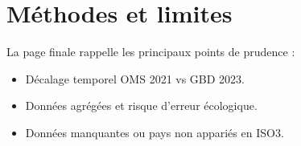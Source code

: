 \section{Méthodes et limites}
La page finale rappelle les principaux points de prudence :
\begin{itemize}
    \item Décalage temporel OMS 2021 vs GBD 2023.
    \item Données agrégées et risque d'erreur écologique.
    \item Données manquantes ou pays non appariés en ISO3.
\end{itemize}
